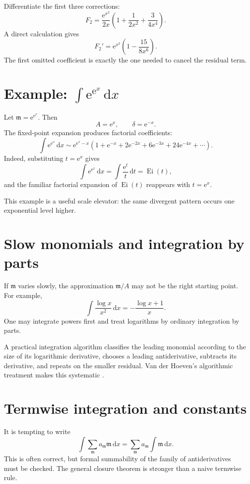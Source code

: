 \documentclass[11pt,openany]{book}
\theoremstyle{definition}
\theoremstyle{plain}
\theoremstyle{remark}
\newcommand{\m}{\mathfrak{m}}
\newcommand{\dd}{\,\mathrm{d}}
\newcommand{\e}{\mathrm{e}}
\newcommand{\asym}{\sim}
\DeclareMathOperator{\Ei}{Ei}
\begin{document}
\begin{workedbox}
Differentiate the first three corrections:
\[
 F_2=\frac{\e^{x^2}}{2x}
 \left(1+\frac1{2x^2}+\frac3{4x^4}\right).
\]
A direct calculation gives
\[
 F_2'=\e^{x^2}\left(1-\frac{15}{8x^6}\right).
\]
The first omitted coefficient is exactly the one needed to cancel the residual term.
\end{workedbox}

\section{Example: $\int\e^{\e^x}\dd x$}

Let $\m=\e^{\e^x}$. Then
\[
 A=\e^x,
 \qquad \delta=\e^{-x}.
\]
The fixed-point expansion produces factorial coefficients:
\begin{equation}\label{eq:int-double-exp}
 \int\e^{\e^x}\dd x
 \asym \e^{\e^x-x}
 \left(1+\e^{-x}+2\e^{-2x}+6\e^{-3x}
 +24\e^{-4x}+\cdots\right).
\end{equation}
Indeed, substituting $t=\e^x$ gives
\[
 \int\e^{\e^x}\dd x=\int\frac{\e^t}{t}\dd t=\Ei(t),
\]
and the familiar factorial expansion of $\Ei(t)$ reappears with $t=\e^x$.

This example is a useful scale elevator: the same divergent pattern occurs one exponential level higher.

\section{Slow monomials and integration by parts}

If $\m$ varies slowly, the approximation $\m/A$ may not be the right starting point. For example,
\[
 \int\frac{\log x}{x^2}\dd x
 =-\frac{\log x+1}{x}.
\]
One may integrate powers first and treat logarithms by ordinary integration by parts.

A practical integration algorithm classifies the leading monomial according to the size of its logarithmic derivative, chooses a leading antiderivative, subtracts its derivative, and repeats on the smaller residual. Van der Hoeven's algorithmic treatment makes this systematic \cite{vdhoeven-book}.

\section{Termwise integration and constants}

It is tempting to write
\[
 \int\sum_{\m}a_{\m}\m\dd x
 =\sum_{\m}a_{\m}\int\m\dd x.
\]
This is often correct, but formal summability of the family of antiderivatives must be checked. The general closure theorem is stronger than a naive termwise rule.
\end{document}
